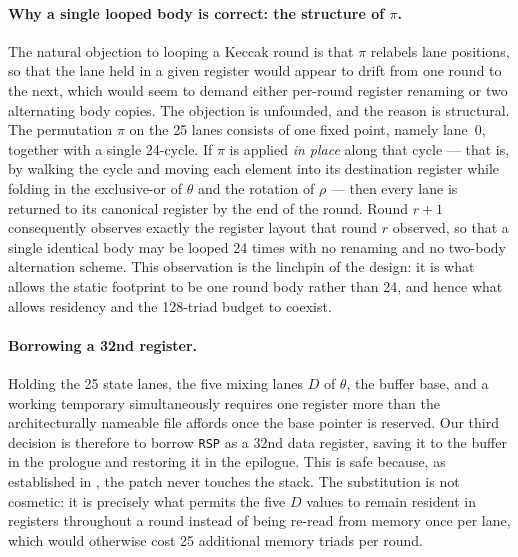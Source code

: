 \paragraph{Why a single looped body is correct: the structure of $\pi$.}
The natural objection to looping a Keccak round is that $\pi$ relabels lane
positions, so that the lane held in a given register would appear to drift from
one round to the next, which would seem to demand either per-round register
renaming or two alternating body copies. The objection is unfounded, and the
reason is structural. The permutation $\pi$ on the 25 lanes consists of one
fixed point, namely lane~0, together with a single 24-cycle. If $\pi$ is
applied \emph{in place} along that cycle --- that is, by walking the cycle and
moving each element into its destination register while folding in the
exclusive-or of $\theta$ and the rotation of $\rho$ --- then every lane is
returned to its canonical register by the end of the round. Round $r{+}1$
consequently observes exactly the register layout that round $r$ observed, so
that a single identical body may be looped 24 times with no renaming and no
two-body alternation scheme. This observation is the linchpin of the design: it
is what allows the static footprint to be one round body rather than 24, and
hence what allows residency and the 128-triad budget to coexist.

\paragraph{Borrowing a 32nd register.}
Holding the 25 state lanes, the five mixing lanes $D$ of $\theta$, the buffer
base, and a working temporary simultaneously requires one register more than
the architecturally nameable file affords once the base pointer is reserved.
Our third decision is therefore to borrow \texttt{RSP} as a 32nd data register,
saving it to the buffer in the prologue and restoring it in the epilogue. This
is safe because, as established in , the patch never touches
the stack. The substitution is not cosmetic: it is precisely what permits the
five $D$ values to remain resident in registers throughout a round instead of
being re-read from memory once per lane, which would otherwise cost 25
additional memory triads per round.


